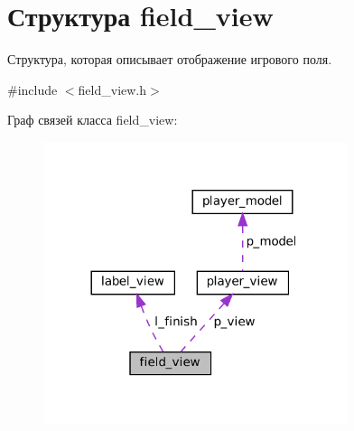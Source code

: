 \hypertarget{structfield__view}{}\section{Структура field\+\_\+view}
\label{structfield__view}


Структура, которая описывает отображение игрового поля.  




{\ttfamily \#include $<$field\+\_\+view.\+h$>$}



Граф связей класса field\+\_\+view\+:\nopagebreak
\begin{figure}[H]
\begin{center}
\leavevmode
\includegraphics[width=252pt]{structfield__view__coll__graph}
\end{center}
\end{figure}
